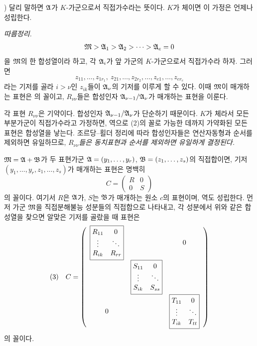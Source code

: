 {\footnotesize{}) 달리 말하면 \(\mathfrak A\)가 \(K\)-가군으로서 직접가수라는 뜻이다. \(K\)가 체이면 이 가정은 언제나 성립한다.\par}

\emph{따름정리.}
\[
        \mathfrak M>\mathfrak A_1>\mathfrak A_2>\cdots>\mathfrak A_e=0
\]
을 \(\mathfrak M\)의 한 합성열이라 하고, 각 \(\mathfrak A_i\)가 앞 가군의 \(K\)-가군으로서 직접가수라 하자. 그러면
\[
        z_{11},\ldots,z_{1r_1},\ z_{21},\ldots,z_{2r_2},\ldots,
        z_{e1},\ldots,z_{er_e}
\]
라는 기저를 골라 \(i>\nu\)인 \(z_{ik}\)들이 \(\mathfrak A_\nu\)의 기저를 이루게 할 수 있다. 이때 \(\mathfrak M\)이 매개하는 표현은
의 꼴이고, \(R_{\nu\nu}\)들은 합성인자 \(\mathfrak A_{\nu-1}/\mathfrak A_\nu\)가 매개하는 표현을 이룬다.

각 표현 \(R_{\nu\nu}\)은 기약이다. 합성인자 \(\mathfrak A_{\nu-1}/\mathfrak A_\nu\)가 단순하기 때문이다. \(K\)가 체라서 모든 부분가군이 직접가수라고 가정하면, 역으로 (2)의 꼴로 가능한 데까지 가약화된 모든 표현은 합성열을 낳는다. 조르당--횔더 정리에 따라 합성인자들은 연산자동형과 순서를 제외하면 유일하므로, \emph{\(R_{\nu\nu}\)들은 동치표현과 순서를 제외하면 유일하게 결정된다.}

\(\mathfrak M=\mathfrak A+\mathfrak B\)가 두 표현가군 \(\mathfrak A=(y_1,\ldots,y_r)\), \(\mathfrak B=(z_1,\ldots,z_s)\)의 직접합이면, 기저 \((y_1,\ldots,y_r,z_1,\ldots,z_s)\)가 매개하는 표현은 명백히
\[
        C=\begin{pmatrix}R&0\\0&S\end{pmatrix}
\]
의 꼴이다. 여기서 \(R\)은 \(\mathfrak A\)가, \(S\)는 \(\mathfrak B\)가 매개하는 원소 \(c\)의 표현이며, 역도 성립한다. 먼저 가군 \(\mathfrak M\)을 직접분해불능 성분들의 직접합으로 나타내고, 각 성분에서 위와 같은 합성열을 찾으면 알맞은 기저를 골랐을 때 표현은
\[
\begin{array}{@{}r@{\quad}c@{}}
(3)&
C=\left(
\begin{array}{ccc}
\boxed{\begin{matrix}
R_{11}&0\\
\vdots&\ddots\\
R_{ik}&R_{rr}
\end{matrix}} & & 0\\[1.4em]
& \boxed{\begin{matrix}
S_{11}&0\\
\vdots&\ddots\\
S_{ik}&S_{ss}
\end{matrix}} & \\[1.4em]
0 & & \boxed{\begin{matrix}
T_{11}&0\\
\vdots&\ddots\\
T_{ik}&T_{tt}
\end{matrix}}
\end{array}
\right)
\end{array}
\]
의 꼴이다.

